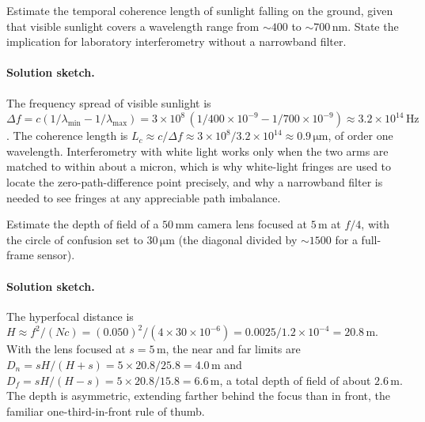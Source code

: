 \begin{exercise}
Estimate the temporal coherence length of sunlight falling on the
ground, given that visible sunlight covers a wavelength range from
$\sim 400$ to $\sim 700\,\si{\nano\meter}$. State the implication for
laboratory interferometry without a narrowband filter.
\paragraph{Solution sketch.} The frequency spread of visible sunlight is
$\Delta f = c(1/\lambda_{\min} - 1/\lambda_{\max}) = 3\times10^{8}\,
(1/400\times10^{-9} - 1/700\times10^{-9}) \approx 3.2\times10^{14}\,\si{
\hertz}$. The coherence length is
$L_{c} \approx c/\Delta f \approx 3\times10^{8}/3.2\times10^{14} \approx
0.9\,\si{\micro\meter}$, of order one wavelength. Interferometry with
white light works only when the two arms are matched to within about a
micron, which is why white-light fringes are used to locate the
zero-path-difference point precisely, and why a narrowband filter is
needed to see fringes at any appreciable path imbalance.
\end{exercise}

\begin{exercise}
Estimate the depth of field of a $50\,\si{\milli\meter}$ camera lens
focused at $5\,\si{\meter}$ at $f/4$, with the circle of confusion
set to $30\,\si{\micro\meter}$ (the diagonal divided by $\sim 1500$
for a full-frame sensor).
\paragraph{Solution sketch.} The hyperfocal distance is
$H \approx f^{2}/(Nc) = (0.050)^{2}/(4\times 30\times10^{-6}) =
0.0025/1.2\times10^{-4} = 20.8\,\si{\meter}$. With the lens focused at
$s = 5\,\si{\meter}$, the near and far limits are
$D_{n} = sH/(H+s) = 5\times 20.8/25.8 = 4.0\,\si{\meter}$ and
$D_{f} = sH/(H-s) = 5\times 20.8/15.8 = 6.6\,\si{\meter}$, a total depth
of field of about $2.6\,\si{\meter}$. The depth is asymmetric, extending
farther behind the focus than in front, the familiar one-third-in-front
rule of thumb.
\end{exercise}

